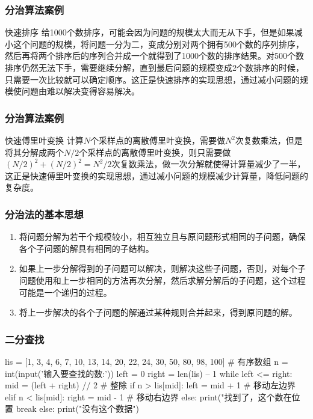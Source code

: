 \begin{frame}
    \frametitle{分治算法案例}
    \begin{block}{快速排序}
      给1000个数排序，可能会因为问题的规模太大而无从下手，但是如果减小这个问题的规模，将问题一分为二，变成分别对两个拥有500个数的序列排序，然后再将两个排序后的序列合并成一个就得到了1000个数的排序结果。对500个数排序仍然无法下手，需要继续分解，直到最后问题的规模变成2个数排序的时候，只需要一次比较就可以确定顺序。这正是快速排序的实现思想，通过减小问题的规模使问题由难以解决变得容易解决。
    \end{block}
\end{frame}

\begin{frame}
  \frametitle{分治算法案例}  
  \begin{block}{快速傅里叶变换}
    计算$N$个采样点的离散傅里叶变换，需要做$N^2$次复数乘法，但是将其分解成两个$N/2$个采样点的离散傅里叶变换，则只需要做$(N/2)^2+(N/2)^2 = N^2/2$次复数乘法，做一次分解就使得计算量减少了一半，这正是快速傅里叶变换的实现思想，通过减小问题的规模减少计算量，降低问题的复杂度。
  \end{block}
\end{frame}

\begin{frame}
    \frametitle{分治法的基本思想}
    \begin{enumerate}
      \item {}
      
      将问题分解为若干个规模较小，相互独立且与原问题形式相同的子问题，确保各个子问题的解具有相同的子结构。
      \item {}
      
      如果上一步分解得到的子问题可以解决，则解决这些子问题，否则，对每个子问题使用和上一步相同的方法再次分解，然后求解分解后的子问题，这个过程可能是一个递归的过程。
      \item {}
      
      将上一步解决的各个子问题的解通过某种规则合并起来，得到原问题的解。
    \end{enumerate}
\end{frame}

\begin{frame}[fragile]
    \frametitle{二分查找}
\begin{codeblock}{}
  lis = [1, 3, 4, 6, 7, 10, 13, 14, 20, 22, 24, 30, 50, 80, 98, 100]  # 有序数组
  n = int(input('输入要查找的数:'))
  left = 0
  right = len(lis) – 1
  while left <= right:
      mid = (left + right) // 2  # 整除
      if n > lis[mid]:
          left = mid + 1  # 移动左边界
      elif n < lis[mid]:
          right = mid - 1  # 移动右边界
      else:
          print("找到了，这个数在位置%
          break
  else:
  print("没有这个数据")
\end{codeblock}
\end{frame}

